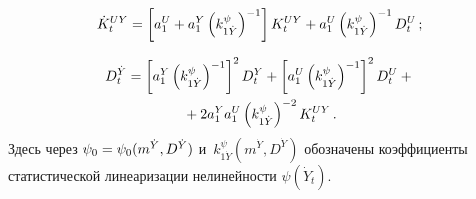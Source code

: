 \begin{multicols}{2}
{     \vspace*{-6pt}
     
     \noindent
    \begin{equation*}
    \dot K_t^{UY} = \lk a_1^U + a_1^Y \left(k_{1\dot Y}^\psi\right)^{-1}\rk K_t^{UY}+
    a_1^U \left(k_{1\dot Y}^\psi\right)^{-1}D_t^U\,; %
    \end{equation*}
    
    \vspace*{-12pt}

\noindent
    \begin{multline*}
          D_t^{\dot Y} = \left[ a_1^Y \left(k_{1\dot Y}^\psi\right)^{-1}\right]^2 D_t^Y + 
          \left[ a_1^U\left(k_{1\dot Y}^\psi\right)^{-1}\right]^2 D_t^U + {}\\
          {}+
          2a_1^Y a_1^U \left(k_{1\dot Y}^\psi\right)^{-2} K_t^{UY}\,.
          \end{multline*}
Здесь через  $\psi_0 \hm=\psi_0 (m^{\dot Y}, D^{\dot Y})$ 
и~$k_{1\dot Y}^\psi (m^{\dot Y}, D^{\dot Y})$ обозначены коэффициенты 
статистической линеаризации нелинейности $\psi(\dot Y_t)$.

}
\end{multicols}
